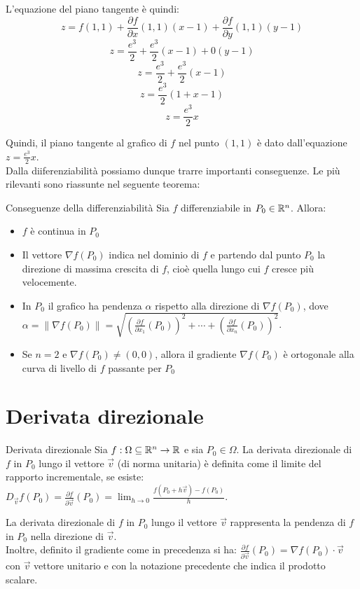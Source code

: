 L'equazione del piano tangente è quindi:
\[
z = f(1,1) + \frac{\partial f}{\partial x}(1,1)(x-1) + \frac{\partial f}{\partial y}(1,1)(y-1)
\]
\[
z = \frac{e^{3}}{2} + \frac{e^{3}}{2}(x-1) + 0(y-1)
\]
\[
z = \frac{e^{3}}{2} + \frac{e^{3}}{2}(x-1)
\]
\[
z = \frac{e^{3}}{2}(1 + x - 1)
\]
\[
z = \frac{e^{3}}{2}x
\]

Quindi, il piano tangente al grafico di $f$ nel punto $(1,1)$ è dato dall'equazione $z = \frac{e^{3}}{2}x$.\\

Dalla diiferenziabilità possiamo dunque trarre importanti conseguenze. Le più rilevanti sono riassunte nel seguente teorema:

\begin{teorema}{Conseguenze della differenziabilità}
  Sia $f$ differenziabile in $P_0 \in \mathbb{R}^n$. Allora:
  \begin{itemize}
    \item $f$ è continua in $P_0$
    \item Il vettore $\nabla f(P_0)$ indica nel dominio di $f$ e partendo dal punto $P_0$ la direzione di massima crescita di $f$, cioè quella lungo cui $f$ cresce più velocemente.
    \item In $P_0$ il grafico ha pendenza $\alpha$ rispetto alla direzione di $\nabla f(P_0)$, dove $\alpha =  \|\nabla f(P_0)\| = \sqrt{\left(\frac{\partial f}{\partial x_1}(P_0)\right)^2 + \cdots + \left(\frac{\partial f}{\partial x_n}(P_0)\right)^2}$.
    \item Se $n=2$ e $\nabla f(P_0)\neq (0,0)$, allora il gradiente $\nabla f(P_0)$ è ortogonale alla curva di livello di $f$ passante per $P_0$
\end{itemize}
\end{teorema}

\section{Derivata direzionale}
\begin{definizione}{Derivata direzionale}
Sia $f:\Omega \subseteq \mathbb{R}^n \rightarrow \mathbb{R}$ e sia $P_0 \in \Omega$. La derivata direzionale di $f$ in $P_0$ lungo il vettore $\vec v$ (di norma unitaria) è definita come il limite del rapporto incrementale, se esiste: $D_{\vec v}f(P_0) = \frac{\partial f}{\partial \vec v}(P_0) = \lim_{h \to 0} \frac{f(P_0 + h\vec v) - f(P_0)}{h}$.
\end{definizione}

\begin{osservazione}{}
La derivata direzionale di $f$ in $P_0$ lungo il vettore $\vec v$ rappresenta la pendenza di $f$ in $P_0$ nella direzione di $\vec v$. \\
Inoltre, definito il gradiente come in precedenza si ha: $\frac{\partial f}{\partial \vec v}(P_0) = \nabla f(P_0) \cdot \vec v $ con $\vec v$ vettore unitario e con la notazione precedente che indica il prodotto scalare.
\end{osservazione}

